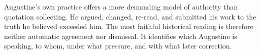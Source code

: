 Augustine's own practice offers a more demanding model of authority than
quotation collecting. He argued, changed, re-read, and submitted his work to
the truth he believed exceeded him. The most faithful historical reading is
therefore neither automatic agreement nor dismissal. It identifies which
Augustine is speaking, to whom, under what pressure, and with what later
correction.
